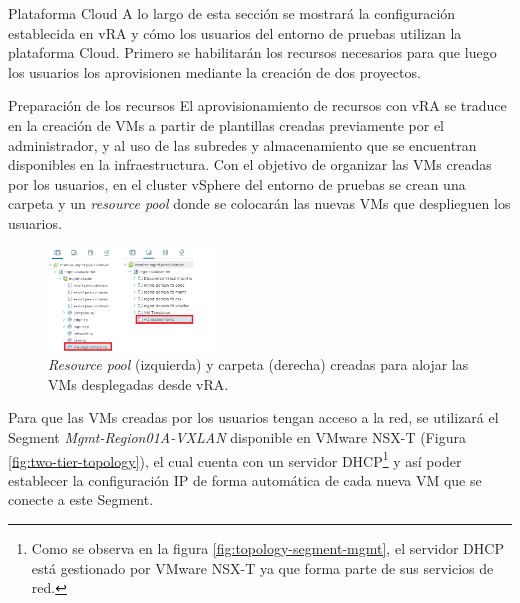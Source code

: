 \begin{subsection}{Plataforma Cloud}
    A lo largo de esta sección se mostrará la configuración establecida en vRA y cómo los usuarios del entorno de pruebas utilizan la plataforma Cloud. Primero se habilitarán los recursos necesarios para que luego los usuarios los aprovisionen mediante la creación de dos proyectos. 

    \begin{subsubsection}{Preparación de los recursos}
    El aprovisionamiento de recursos con vRA se traduce en la creación de VMs a partir de plantillas creadas previamente por el administrador, y al uso de las subredes y almacenamiento que se encuentran disponibles en la infraestructura. Con el objetivo de organizar las VMs creadas por los usuarios, en el cluster vSphere del entorno de pruebas se crean una carpeta y un \textit{resource pool} donde se colocarán las nuevas VMs que desplieguen los usuarios.
    \begin{figure}[h]
        \centering
        \includegraphics[width=0.4\textwidth]{imaxes/pruebaconcepto/vrealize/rp-vra.png}
        \caption{\textit{Resource pool} (izquierda) y carpeta (derecha) creadas para alojar las VMs desplegadas desde vRA.}
        \label{fig:rp-folder-vra}
    \end{figure}
    \FloatBarrier
    Para que las VMs creadas por los usuarios tengan acceso a la red, se utilizará el Segment \textit{Mgmt-Region01A-VXLAN} disponible en VMware NSX-T (Figura \ref{fig:two-tier-topology}), el cual cuenta con un servidor DHCP\footnote{Como se observa en la figura \ref{fig:topology-segment-mgmt}, el servidor DHCP está gestionado por VMware NSX-T ya que forma parte de sus servicios de red.} y así poder establecer la configuración IP de forma automática de cada nueva VM que se conecte a este Segment. 

\end{subsubsection}
\end{subsection}
